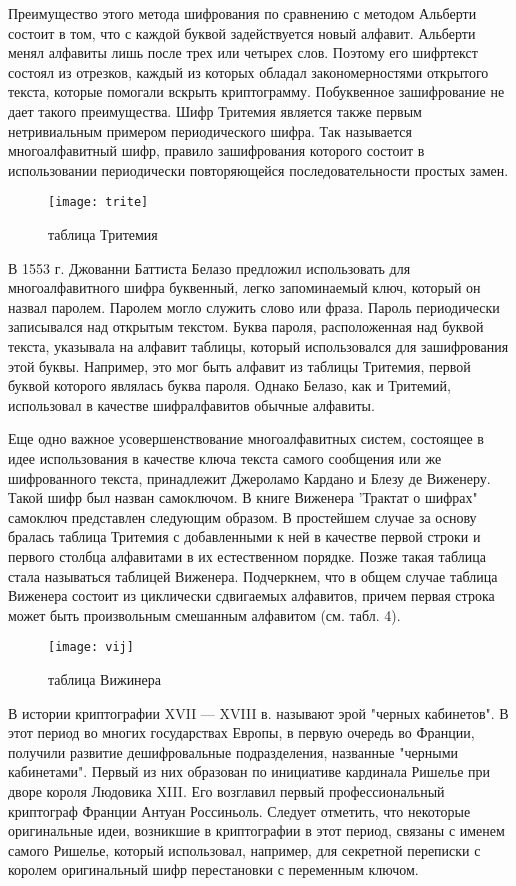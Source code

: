 Преимущество этого метода шифрования по сравнению с методом Альберти состоит в том, что с каждой буквой задействуется новый алфавит. Альберти менял алфавиты лишь по­сле трех или четырех слов. Поэтому его шифртекст состоял из отрезков, каждый из которых обладал закономерностями открытого текста, которые помогали вскрыть криптограмму. Побуквенное зашифрование не дает такого преимущества. Шифр Тритемия является также первым нетривиальным примером периодического шифра. Так называется многоалфавитный шифр, правило зашифрования которого состоит в использовании периодически повторяющейся последовательности простых замен.

\begin{figure}[H]
	\texttt{[image: trite]}
	\centering
	\caption{таблица Тритемия}
\end{figure}



В 1553 г. Джованни Баттиста Белазо предложил использовать для многоалфавитного шифра буквенный, легко запо­минаемый ключ, который он назвал паролем. Паролем могло служить слово или фраза. Пароль периодически записывался над открытым текстом. Буква пароля, расположенная над буквой текста, указывала на алфавит таблицы, который исполь­зовался для зашифрования этой буквы. Например, это мог быть алфавит из таблицы Тритемия, первой буквой которого являлась буква пароля. Однако Белазо, как и Тритемий, использовал в качестве шифралфавитов обычные алфавиты.

Еще одно важное усовершенствование многоалфавитных систем, состоящее в идее использования в качестве ключа текста самого сообщения или же шифрованного текста, при­надлежит Джероламо Кардано и Блезу де Виженеру. Такой шифр был назван самоключом. В книге Виженера 'Трактат о шифрах" самоключ представлен следующим образом. В про­стейшем случае за основу бралась таблица Тритемия с добав­ленными к ней в качестве первой строки и первого столбца алфавитами в их естественном порядке. Позже такая таблица стала называться таблицей Виженера. Подчеркнем, что в общем случае таблица Виженера состоит из циклически сдви­гаемых алфавитов, причем первая строка может быть произ­вольным смешанным алфавитом (см. табл. 4).

\begin{figure}[H]
	\texttt{[image: vij]}
	\centering
	\caption{таблица Вижинера}
\end{figure}


В истории криптографии XVII — XVIII в. называют эрой "черных кабинетов". В этот период во многих государствах Европы, в первую очередь во Франции, получили развитие дешифровальные подразделения, названные "черными кабинетами". Первый из них образован по инициативе кардинала Ришелье при дворе короля Людовика XIII. Его возглавил первый профессиональный криптограф Франции Антуан Россиньоль. Следует отметить, что некоторые оригинальные идеи, возникшие в криптографии в этот период, связаны с именем самого Ришелье, который использовал, например, для секретной переписки с королем оригинальный шифр перестановки с переменным ключом.

